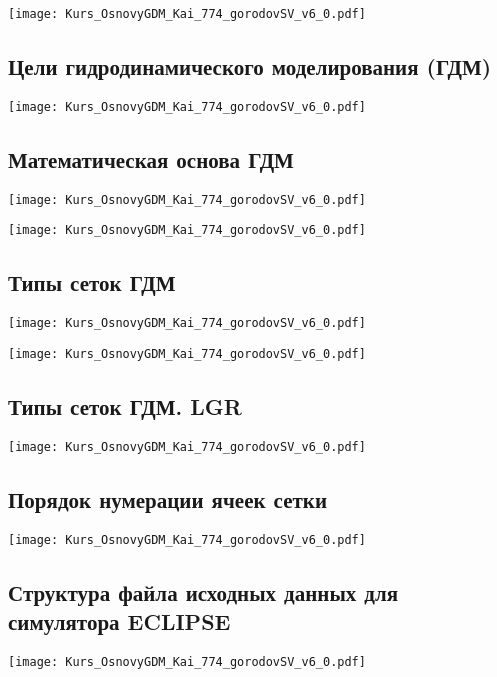 \documentclass[main.tex]{subfiles}
\begin{document}
\texttt{[image: Kurs\_OsnovyGDM\_Kai\_774\_gorodovSV\_v6\_0.pdf]}

\subsection{Цели гидродинамического моделирования (ГДМ)}

\texttt{[image: Kurs\_OsnovyGDM\_Kai\_774\_gorodovSV\_v6\_0.pdf]}

\subsection{Математическая основа ГДМ}

\texttt{[image: Kurs\_OsnovyGDM\_Kai\_774\_gorodovSV\_v6\_0.pdf]}

\texttt{[image: Kurs\_OsnovyGDM\_Kai\_774\_gorodovSV\_v6\_0.pdf]}

\subsection{Типы сеток ГДМ}

\texttt{[image: Kurs\_OsnovyGDM\_Kai\_774\_gorodovSV\_v6\_0.pdf]}

\texttt{[image: Kurs\_OsnovyGDM\_Kai\_774\_gorodovSV\_v6\_0.pdf]}

\subsection{Типы сеток ГДМ. LGR}

\texttt{[image: Kurs\_OsnovyGDM\_Kai\_774\_gorodovSV\_v6\_0.pdf]}

\subsection{Порядок нумерации ячеек сетки}

\texttt{[image: Kurs\_OsnovyGDM\_Kai\_774\_gorodovSV\_v6\_0.pdf]}

\subsection{Структура файла исходных данных для симулятора ECLIPSE}

\texttt{[image: Kurs\_OsnovyGDM\_Kai\_774\_gorodovSV\_v6\_0.pdf]}
\end{document}
